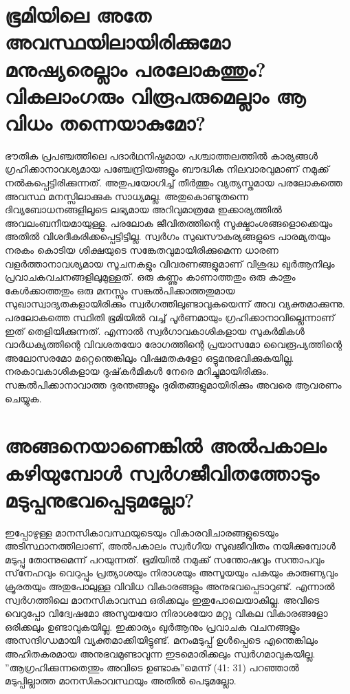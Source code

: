  \section{ ഭൂമിയിലെ അതേ അവസ്ഥയിലായിരിക്കുമോ മനുഷ്യരെല്ലാം പരലോകത്തും? വികലാംഗരും വിരൂപരുമെല്ലാം ആ വിധം തന്നെയാകുമോ?}
 ഭൗതിക പ്രപഞ്ചത്തിലെ പദാര്‍ഥനിഷ്ഠമായ പശ്ചാത്തലത്തില്‍ കാര്യങ്ങള്‍ ഗ്രഹിക്കാനാവശ്യമായ പഞ്ചേന്ദ്രിയങ്ങളും ബൗദ്ധിക നിലവാരവുമാണ് നമുക്ക് നല്‍കപ്പെട്ടിരിക്കുന്നത്. അതുപയോഗിച്ച് തീര്‍ത്തും വ്യത്യസ്തമായ പരലോകത്തെ അവസ്ഥ മനസ്സിലാക്കുക സാധ്യമല്ല. അതുകൊണ്ടുതന്നെ ദിവ്യബോധനങ്ങളിലൂടെ ലഭ്യമായ അറിവുമാത്രമേ ഇക്കാര്യത്തില്‍ അവലംബനീയമായുള്ളൂ. പരലോക ജീവിതത്തിന്റെ സൂക്ഷ്മാംശങ്ങളൊക്കെയും അതില്‍ വിശദീകരിക്കപ്പെട്ടിട്ടില്ല. സ്വര്‍ഗം സുഖസൗകര്യങ്ങളുടെ പാരമ്യതയും നരകം കൊടിയ ശിക്ഷയുടെ സങ്കേതവുമായിരിക്കുമെന്ന ധാരണ വളര്‍ത്താനാവശ്യമായ സൂചനകളും വിവരണങ്ങളുമാണ് വിശുദ്ധ ഖുര്‍ആനിലും പ്രവാചകവചനങ്ങളിലുമുള്ളത്. ഒരു കണ്ണും കാണാത്തതും ഒരു കാതും കേള്‍ക്കാത്തതും ഒരു മനസ്സും സങ്കല്‍പിക്കാത്തതുമായ സുഖാസ്വാദ്യതകളായിരിക്കും സ്വര്‍ഗത്തിലുണ്ടാവുകയെന്ന് അവ വ്യക്തമാക്കുന്നു. പരലോകത്തെ സ്ഥിതി ഭൂമിയില്‍ വച്ച് പൂര്‍ണമായും ഗ്രഹിക്കാനാവില്ലെന്നാണ് ഇത് തെളിയിക്കുന്നത്.
എന്നാല്‍ സ്വര്‍ഗാവകാശികളായ സുകര്‍മികള്‍ വാര്‍ധക്യത്തിന്റെ വിവശതയോ രോഗത്തിന്റെ പ്രയാസമോ വൈരൂപ്യത്തിന്റെ അലോസരമോ മറ്റെന്തെങ്കിലും വിഷമതകളോ ഒട്ടുമനുഭവിക്കുകയില്ല. നരകാവകാശികളായ ദുഷ്‌കര്‍മികള്‍ നേരെ മറിച്ചുമായിരിക്കും. സങ്കല്‍പിക്കാനാവാത്ത ദുരന്തങ്ങളും ദുരിതങ്ങളുമായിരിക്കും അവരെ ആവരണം ചെയ്യുക.
\section{ അങ്ങനെയാണെങ്കില്‍ അല്‍പകാലം കഴിയുമ്പോള്‍ സ്വര്‍ഗജീവിതത്തോടും മടുപ്പനുഭവപ്പെടുമല്ലോ?}
 ഇപ്പോഴുള്ള മാനസികാവസ്ഥയുടെയും വികാരവിചാരങ്ങളുടെയും അടിസ്ഥാനത്തിലാണ്, അല്‍പകാലം സ്വര്‍ഗീയ സുഖജീവിതം നയിക്കുമ്പോള്‍ മടുപ്പു തോന്നുമെന്ന് പറയുന്നത്. ഭൂമിയില്‍ നമുക്ക് സന്തോഷവും സന്താപവും സ്‌നേഹവും വെറുപ്പും പ്രത്യാശയും നിരാശയും അസൂയയും പകയും കാരുണ്യവും ക്രൂരതയും അതുപോലുള്ള വിവിധ വികാരങ്ങളും അനുഭവപ്പെടാറുണ്ട്. എന്നാല്‍ സ്വര്‍ഗത്തിലെ മാനസികാവസ്ഥ ഒരിക്കലും ഇതുപോലെയാകില്ല. അവിടെ വെറുപ്പോ വിദ്വേഷമോ അസൂയയോ നിരാശയോ മറ്റു വികല വികാരങ്ങളോ ഒരിക്കലും ഉണ്ടാവുകയില്ല. ഇക്കാര്യം ഖുര്‍ആനും പ്രവാചക വചനങ്ങളും അസന്ദിഗ്ധമായി വ്യക്തമാക്കിയിട്ടുണ്ട്. മനംമടുപ്പ് ഉള്‍പ്പെടെ എന്തെങ്കിലും അഹിതകരമായ അനുഭവമുണ്ടാവുന്ന ഇടമൊരിക്കലും സ്വര്‍ഗമാവുകയില്ല. ''ആഗ്രഹിക്കുന്നതെന്തും അവിടെ ഉണ്ടാകു''മെന്ന് (41: 31) പറഞ്ഞാല്‍ മടുപ്പില്ലാത്ത മാനസികാവസ്ഥയും അതില്‍ പെടുമല്ലോ.
